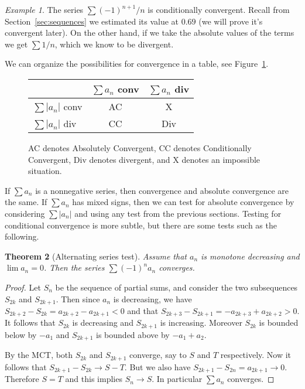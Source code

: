 \documentclass[11pt,oneside]{amsbook}
\theoremstyle{definition}
\theoremstyle{plain}
\newtheorem{theorem}{Theorem}[section]
\theoremstyle{definition}
\theoremstyle{remark}
\newtheorem{example}[theorem]{Example}
\numberwithin{equation}{section}
\numberwithin{figure}{section}
\begin{document}
\begin{example}
  The series $\sum(-1)^{n+1}/n$ is conditionally convergent. Recall from Section~\ref{sec:sequences} we estimated its value at $0.69$ (we will prove it's convergent later). On the other hand, if we take the absolute values of the terms we get $\sum 1/n$, which we know to be divergent.
\end{example}

We can organize the possibilities for convergence in a table, see Figure~\ref{fig:convergence}.

\begin{figure}[h]
  \begin{tabular}{l|cc}
                     & $\sum a_n$ conv & $\sum a_n$ div\\\hline
    $\sum|a_n|$ conv & AC & X\\
    $\sum|a_n|$ div & CC & Div
  \end{tabular}
  \caption{AC denotes Absolutely Convergent, CC denotes Conditionally Convergent, Div denotes divergent, and X denotes an impossible situation\label{fig:convergence}.}
\end{figure}

If $\sum a_n$ is a nonnegative series, then convergence and absolute convergence are the same. If $\sum a_n$ has mixed signs, then we can test for absolute convergence by considering $\sum|a_n|$ and using any test from the previous sections. Testing for conditional convergence is more subtle, but there are some tests such as the following.

\begin{theorem}[Alternating series test]
  Assume that $a_n$ is monotone decreasing and $\lim a_n=0$. Then the series $\sum(-1)^na_n$ converges.
\end{theorem}

\begin{proof}
  Let $S_n$ be the sequence of partial sums, and consider the two subsequences $S_{2k}$ and $S_{2k+1}$. Then since $a_n$ is decreasing, we have $S_{2k+2}-S_{2k}=a_{2k+2}-a_{2k+1}<0$ and that $S_{2k+3}-S_{2k+1}=-a_{2k+3}+a_{2k+2}>0$. It follows that $S_{2k}$ is decreasing and $S_{2k+1}$ is increasing. Moreover $S_{2k}$ is bounded below by $-a_1$ and $S_{2k+1}$ is bounded above by $-a_1+a_2$.

  By the MCT, both $S_{2k}$ and $S_{2k+1}$ converge, say to $S$ and $T$ respectively. Now it follows that $S_{2k+1}-S_{2k}\to S-T$. But we also have $S_{2k+1}-S_{2n}=a_{2k+1}\to0$. Therefore $S=T$ and this implies $S_n\to S$. In particular $\sum a_n$ converges.
\end{proof}
\end{document}
